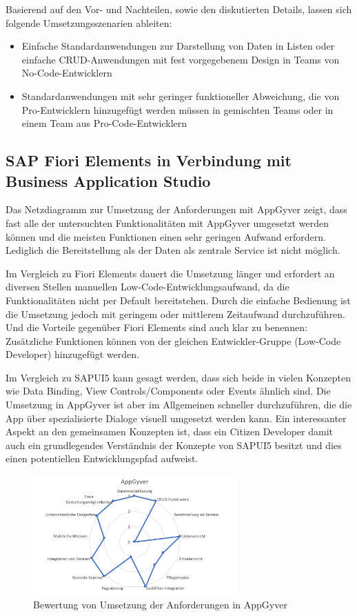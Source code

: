 Basierend auf den Vor- und Nachteilen, sowie den diskutierten Details, lassen sich folgende Umsetzungsszenarien ableiten:
\begin{itemize} 
  \item Einfache Standardanwendungen zur Darstellung von Daten in Listen oder einfache CRUD-Anwendungen mit fest vorgegebenem Design in Teams von No-Code-Entwicklern
  \item Standardanwendungen mit sehr geringer funktioneller Abweichung, die von Pro-Entwicklern hinzugefügt werden müssen in gemischten Teams oder in einem Team aus Pro-Code-Entwicklern
\end{itemize}

\subsection{SAP Fiori Elements in Verbindung mit Business Application Studio}
Das Netzdiagramm zur Umsetzung der Anforderungen mit AppGyver zeigt, dass fast alle der untersuchten Funktionalitäten mit AppGyver umgesetzt werden können und die meisten Funktionen einen sehr geringen Aufwand erfordern. Lediglich die Bereitstellung als der Daten als zentrale Service ist nicht möglich. 

Im Vergleich zu Fiori Elements dauert die Umsetzung länger und erfordert an diversen Stellen manuellen Low-Code-Entwicklungsaufwand, da die Funktionalitäten nicht per Default bereitstehen. Durch die einfache Bedienung ist die Umsetzung jedoch mit geringem oder mittlerem Zeitaufwand durchzuführen. Und die Vorteile gegenüber Fiori Elements sind auch klar zu benennen: Zusätzliche Funktionen können von der gleichen Entwickler-Gruppe (Low-Code Developer) hinzugefügt werden.

Im Vergleich zu SAPUI5 kann gesagt werden, dass sich beide in vielen Konzepten wie Data Binding, View Controls/Components oder Events ähnlich sind. Die Umsetzung in AppGyver ist aber im Allgemeinen schneller durchzuführen, die die App über spezialisierte Dialoge visuell umgesetzt werden kann. Ein interessanter Aspekt an den gemeinsamen Konzepten ist, dass ein Citizen Developer damit auch ein grundlegendes Verständnis der Konzepte von SAPUI5 besitzt und dies einen potentiellen Entwicklungspfad aufweist.

\begin{figure}[!htbp]
 \centering
 \includegraphics[width=0.7\textwidth]{Bilder/bewertung/ND_AppGyver.jpg}
 \caption{Bewertung von Umsetzung der Anforderungen in AppGyver}
\end{figure}

